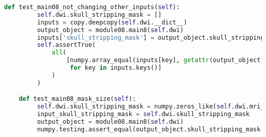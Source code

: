 \begin{lstlisting}[language=Python, caption = Implemented tests.]
    def test_main08_not_changing_other_inputs(self):
         self.dwi.skull_stripping_mask = []
         inputs = copy.deepcopy(self.dwi.__dict__)
         output_object = module08.main8(self.dwi)
         inputs['skull_stripping_mask'] = output_object.skull_stripping_mask
         self.assertTrue(
             all(
                 [numpy.array_equal(inputs[key], getattr(output_object, key))
                  for key in inputs.keys()]
             )
         )

    def test_main08_mask_size(self):
         self.dwi.skull_stripping_mask = numpy.zeros_like(self.dwi.mri_input.diffusion_data[:, :, 0, 0])
         input_skull_stripping_mask = self.dwi.skull_stripping_mask
         output_object = module08.main8(self.dwi)
         numpy.testing.assert_equal(output_object.skull_stripping_mask.shape(), input_skull_stripping_mask.shape())

\end{lstlisting}
